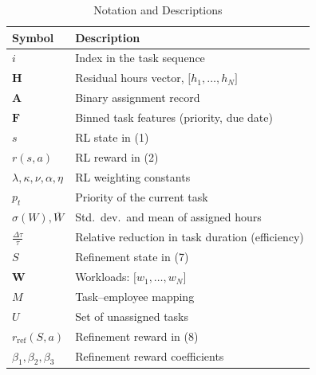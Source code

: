 \documentclass[%
aip,
cp,  %
reprint
]{revtex4-2}
\begin{document}
	\begin{table}[!hb]
		\caption{\label{tab:notation}Notation and Descriptions}
		\begin{ruledtabular}
			\begin{tabular}{ll}
				\textbf{Symbol}                  & \textbf{Description}                                   \\
				\hline
				$i$                              & Index in the task sequence                             \\
				$\mathbf{H}$                     & Residual hours vector, $\bigl[h_{1},\dots,h_{N}\bigr]$ \\
				$\mathbf{A}$                     & Binary assignment record                               \\
				$\mathbf{F}$                     & Binned task features (priority, due date)              \\
				$s$                              & RL state in (1)                                        \\
				$r(s,a)$                         & RL reward in (2)                                       \\
				$\lambda,\kappa,\nu,\alpha,\eta$ & RL weighting constants                                 \\
				$p_{t}$                          & Priority of the current task                           \\
				$\sigma(W), \overline{W}$        & Std.\ dev.\ and mean of assigned hours                 \\
				$\tfrac{\Delta\tau}{\tau}$       & Relative reduction in task duration (efficiency)       \\
				$S$                              & Refinement state in (7)                                \\
				$\mathbf{W}$                     & Workloads: $\bigl[w_{1},\dots,w_{N}\bigr]$             \\
				$M$                              & Task--employee mapping                                 \\
				$U$                              & Set of unassigned tasks                                \\
				$r_{\text{ref}}(S,a)$            & Refinement reward in (8)                               \\
				$\beta_{1},\beta_{2},\beta_{3}$  & Refinement reward coefficients                         \\
			\end{tabular}
		\end{ruledtabular}
	\end{table}
	
\end{document}
